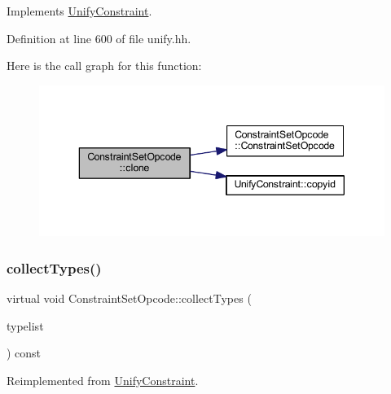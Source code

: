 Implements \mbox{\hyperlink{class_unify_constraint_a4f068343932637d355644bb21559aa12}{Unify\+Constraint}}.



Definition at line 600 of file unify.\+hh.

Here is the call graph for this function\+:
\nopagebreak
\begin{figure}[H]
\begin{center}
\leavevmode
\includegraphics[width=343pt]{class_constraint_set_opcode_a619038e1115459c881218dce94f186d8_cgraph}
\end{center}
\end{figure}
\mbox{\label{class_constraint_set_opcode_acfa6f851bec946e149a316c794768feb}} 
\subsubsection{\texorpdfstring{collectTypes()}{collectTypes()}}
{\footnotesize\ttfamily virtual void Constraint\+Set\+Opcode\+::collect\+Types (\begin{DoxyParamCaption}\item[{vector$<$ \mbox{\hyperlink{class_unify_datatype}{Unify\+Datatype}} $>$ \&}]{typelist }\end{DoxyParamCaption}) const\hspace{0.3cm}{\ttfamily [virtual]}}



Reimplemented from \mbox{\hyperlink{class_unify_constraint_acb83b6bea3b21e13054e72ac9cfaba0f}{Unify\+Constraint}}.

\mbox{\label{class_constraint_set_opcode_aa860868c8820d374ee09d0cc24083613}} 
